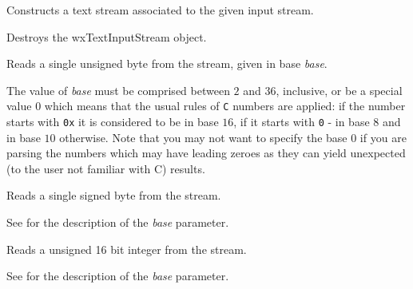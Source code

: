 Constructs a text stream associated to the given input stream.






\label{wxtextinputstreamdtor}


Destroys the wxTextInputStream object.


\label{wxtextinputstreamread8}


Reads a single unsigned byte from the stream, given in base {\it base}.

The value of {\it base} must be comprised between $2$ and $36$, inclusive, or
be a special value $0$ which means that the usual rules of {\tt C} numbers are
applied: if the number starts with {\tt 0x} it is considered to be in base
$16$, if it starts with {\tt 0} - in base $8$ and in base $10$ otherwise. Note
that you may not want to specify the base $0$ if you are parsing the numbers
which may have leading zeroes as they can yield unexpected (to the user not
familiar with C) results.


\label{wxtextinputstreamread8s}


Reads a single signed byte from the stream.

See  for the
description of the {\it base} parameter.


\label{wxtextinputstreamread16}


Reads a unsigned 16 bit integer from the stream.

See  for the
description of the {\it base} parameter.


\label{wxtextinputstreamread16s}

